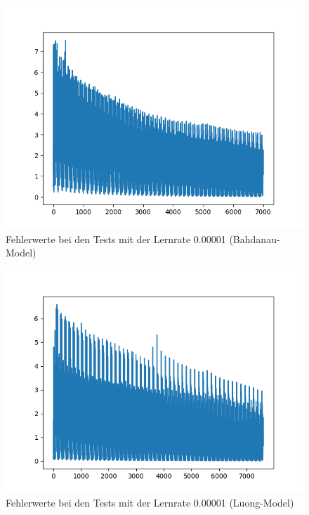 	\begin{figure}[H]
		\centering
		\includegraphics[scale=0.55]{images/bslm_bahdanau_2e_5_50EP_P3.png}
		\caption{Fehlerwerte bei den Tests mit der Lernrate 0.00001 (Bahdanau-Model)}
		\label{BSLM_Bahdanau_lr1e-5_50EP}
	\end{figure}
	\begin{figure}[H]
		\centering
		\includegraphics[scale=0.55]{images/bslm_luong_50PT3_2e-5.png}
		\caption{Fehlerwerte bei den Tests mit der Lernrate 0.00001 (Luong-Model)}
		\label{BSLM_Luong_lr2e-5_50EP}
	\end{figure}
	
	\caption{Fehlerwerte bei den Tests mit der Lernrate 0.00001}
	\label{fig:lr_00001}


